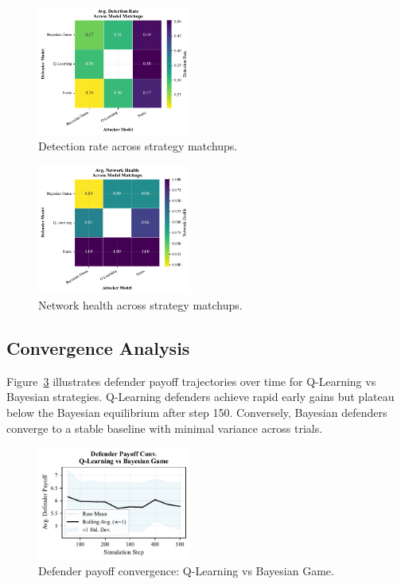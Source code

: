 \documentclass[conference]{IEEEtran}
\begin{document}
\begin{figure}[htbp]
  \centering
  \includegraphics[width=0.45\textwidth]{fig_detection_heatmap.pdf}
  \caption{Detection rate across strategy matchups.}
  \label{fig:detection_heatmap}
\end{figure}

\begin{figure}[htbp]
  \centering
  \includegraphics[width=0.45\textwidth]{fig_net_health_heatmap.pdf}
  \caption{Network health across strategy matchups.}
  \label{fig:health_heatmap}
\end{figure}

\subsection{Convergence Analysis}
Figure~\ref{fig:conv_db} illustrates defender payoff trajectories over time for Q-Learning vs Bayesian strategies. Q-Learning defenders achieve rapid early gains but plateau below the Bayesian equilibrium after step 150. Conversely, Bayesian defenders converge to a stable baseline with minimal variance across trials.

\begin{figure}[htbp]
  \centering
  \includegraphics[width=0.45\textwidth]{fig_def_convergence.pdf}
  \caption{Defender payoff convergence: Q-Learning vs Bayesian Game.}
  \label{fig:conv_db}
\end{figure}
\end{document}
